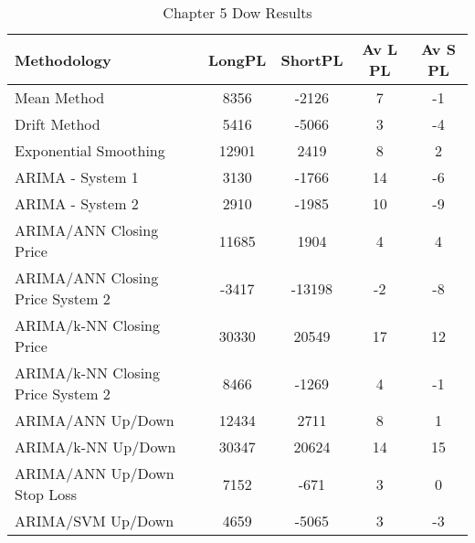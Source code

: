 \begin{table}[ht]
\centering
\caption[Chapter 5 Dow Results]{Chapter 5 Dow Results} 
\label{tab:chp6:dow2_summary}
\begin{tabular}{lcccc}
  \toprule Methodology & LongPL & ShortPL & Av L PL & Av S PL \\ 
  \midrule Mean Method & 8356 & -2126 & 7 & -1 \\ 
  Drift Method & 5416 & -5066 & 3 & -4 \\ 
  Exponential Smoothing & 12901 & 2419 & 8 & 2 \\ 
  ARIMA - System 1 & 3130 & -1766 & 14 & -6 \\ 
  ARIMA - System 2 & 2910 & -1985 & 10 & -9 \\ 
  ARIMA/ANN Closing Price & 11685 & 1904 & 4 & 4 \\ 
  ARIMA/ANN Closing Price System 2 & -3417 & -13198 & -2 & -8 \\ 
  ARIMA/k-NN Closing Price & 30330 & 20549 & 17 & 12 \\ 
  ARIMA/k-NN Closing Price System 2 & 8466 & -1269 & 4 & -1 \\ 
  ARIMA/ANN Up/Down & 12434 & 2711 & 8 & 1 \\ 
  ARIMA/k-NN Up/Down & 30347 & 20624 & 14 & 15 \\ 
  ARIMA/ANN Up/Down Stop Loss & 7152 & -671 & 3 & 0 \\ 
  ARIMA/SVM Up/Down & 4659 & -5065 & 3 & -3 \\ 
   \bottomrule \end{tabular}
\end{table}
